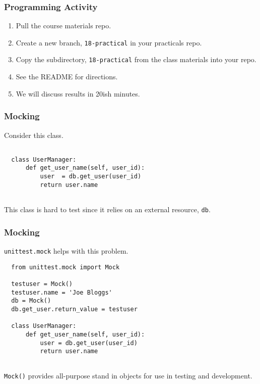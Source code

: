 \documentclass[10pt]{beamer}
\begin{document}
\begin{frame}
  \frametitle{Programming Activity}
  
  \begin{enumerate}
    \item Pull the course materials repo.
    \item Create a new branch, \texttt{18-practical} in your practicals repo.
    \item Copy the subdirectory, \texttt{18-practical} from the class materials into your repo.
    \item See the README for directions.
    \item We will discuss results in 20ish minutes.
  \end{enumerate}      
\end{frame}
  


\begin{frame}[fragile]
  \frametitle{Mocking}
  
  Consider this class.
  \begin{verbatim}
  
  class UserManager:
      def get_user_name(self, user_id):
          user  = db.get_user(user_id)
          return user.name
                      
  \end{verbatim} 
  
  This class is hard to test since it relies on an external resource, \texttt{db}.
   
\end{frame}
\begin{frame}[fragile]
  \frametitle{Mocking}
  
  \texttt{unittest.mock} helps with this problem.
  
  \begin{verbatim}
  from unittest.mock import Mock
  
  testuser = Mock()
  testuser.name = 'Joe Bloggs'
  db = Mock()
  db.get_user.return_value = testuser
  
  class UserManager:
      def get_user_name(self, user_id):
          user = db.get_user(user_id)
          return user.name
                      
  \end{verbatim} 
  
  \texttt{Mock()} provides all-purpose stand in objects for use in testing and development.
   
\end{frame}
\end{document}

